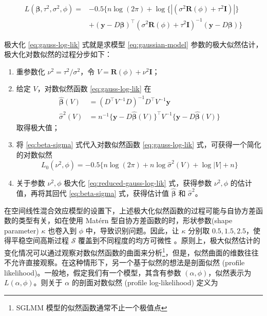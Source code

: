 \documentclass[12pt,a4paper,UTF8,twoside]{book}
\providecommand{\tightlist}{%
  \setlength{\itemsep}{0pt}\setlength{\parskip}{0pt}}
\theoremstyle{definition}
\theoremstyle{definition}
\theoremstyle{definition}
\theoremstyle{remark}
\begin{document}
\begin{equation}
\begin{aligned}
L(\boldsymbol{\beta},\tau^2,\sigma^2,\phi) = {} 
 & - 0.5\{ n\log(2\pi) + \log\{|(\sigma^2\mathbf{R}(\phi)+\tau^2\mathbf{I})|\} \\
 & + (\mathbf{y} - D\boldsymbol{\beta})^{\top}(\sigma^2\mathbf{R}(\phi)+\tau^2\mathbf{I})^{-1}(\mathbf{y} - D\boldsymbol{\beta}) \}  
\end{aligned} \label{eq:gauss-log-lik}
\end{equation}

\noindent 极大化 \eqref{eq:gauss-log-lik} 式就是求模型
\eqref{eq:gaussian-model}
参数的极大似然估计，极大化对数似然的过程分步如下：

\begin{enumerate}
\def\labelenumi{\arabic{enumi}.}
\tightlist
\item
  重参数化 \(\nu^2 = \tau^2/\sigma^2\)，令
  \(V = \mathbf{R}(\phi) + \nu^2 \mathbf{I}\)；
\item
  给定 \(V\)，对数似然函数 \eqref{eq:gauss-log-lik} 在 \begin{equation}
  \begin{aligned}
     \hat{\boldsymbol{\beta}}(V) & =  (D^{\top} V^{-1} D)^{-1} D^{\top} V^{-1}\mathbf{y} \\
     \hat{\sigma}^2(V)           & =  n^{-1} \{\mathbf{y} - D\hat{\boldsymbol{\beta}}(V)\}^{\top} V^{-1} \{\mathbf{y} - D\hat{\boldsymbol{\beta}}(V)\}
  \end{aligned} \label{eq:beta-sigma}
  \end{equation} 取得极大值；
\item
  将 \eqref{eq:beta-sigma} 式代入对数似然函数 \eqref{eq:gauss-log-lik}
  式，可获得一个简化的对数似然 \begin{equation}
     L_{0}(\nu^2,\phi) = - 0.5\{ n\log(2\pi) + n\log \hat{\sigma}^2(V) + \log |V| + n \} \label{eq:reduced-gauss-log-lik}
  \end{equation}
\item
  关于参数 \(\nu^2, \phi\) 极大化 \eqref{eq:reduced-gauss-log-lik}
  式，获得参数 \(\nu^2, \phi\) 的估计值，再将其回代 \eqref{eq:beta-sigma}
  式，获得估计值 \(\hat{\boldsymbol{\beta}}\) 和 \(\hat{\sigma}^2\)。
\end{enumerate}

在空间线性混合效应模型的设置下，上述极大化似然函数的过程可能与自协方差函数的类型有关，如在使用
Matérn 型自协方差函数的时，形状参数(shape parameter) \(\kappa\) 也卷入到
\(\phi\) 中，导致识别问题。因此，让 \(\kappa\) 分别取
\(0.5,1.5,2.5\)，使得平稳空间高斯过程 \(\mathcal{S}\)
覆盖到不同程度的均方可微性
\citep{Warnes1987}。原则上，极大似然估计的变化情况可以通过观察对数似然函数的曲面来分析\footnote{SGLMM
  模型的似然函数通常不止一个极值点}，但是，似然曲面的维数往往不允许直接观察。在这种情形下，另一个基于似然的想法是剖面似然
(profile likelihood)。一般地，假定我们有一个模型，其含有参数
\((\alpha,\phi)\)，似然表示为 \(L(\alpha,\phi)\)。则关于 \(\alpha\)
的剖面对数似然 (profile log-likelihood) 定义为
\end{document}
